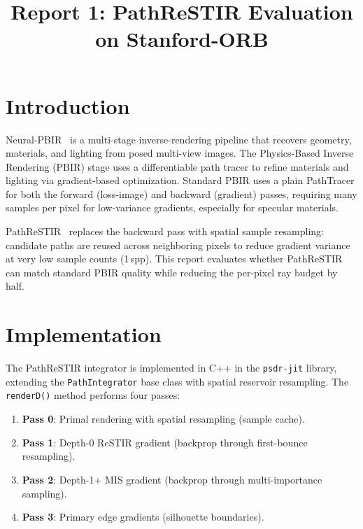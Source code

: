 
\title{Report 1: PathReSTIR Evaluation on Stanford-ORB}

\maketitle

\section{Introduction}

Neural-PBIR~\cite{neuralpbir2024} is a multi-stage inverse-rendering pipeline
that recovers geometry, materials, and lighting from posed multi-view images.
The Physics-Based Inverse Rendering (PBIR) stage uses a differentiable path
tracer to refine materials and lighting via gradient-based optimization. Standard
PBIR uses a plain PathTracer for both the forward (loss-image) and backward
(gradient) passes, requiring many samples per pixel for low-variance gradients,
especially for specular materials.

PathReSTIR~\cite{restir2020} replaces the backward pass with spatial sample
resampling: candidate paths are reused across neighboring pixels to reduce
gradient variance at very low sample counts (1\,spp). This report evaluates
whether PathReSTIR can match standard PBIR quality while reducing the per-pixel
ray budget by half.

\section{Implementation}

The PathReSTIR integrator is implemented in C++ in the \texttt{psdr-jit}
library, extending the \texttt{PathIntegrator} base class with spatial reservoir
resampling. The \texttt{renderD()} method performs four passes:

\begin{enumerate}
    \item \textbf{Pass 0}: Primal rendering with spatial resampling (sample cache).
    \item \textbf{Pass 1}: Depth-0 ReSTIR gradient (backprop through first-bounce resampling).
    \item \textbf{Pass 2}: Depth-1+ MIS gradient (backprop through multi-importance sampling).
    \item \textbf{Pass 3}: Primary edge gradients (silhouette boundaries).
\end{enumerate}

